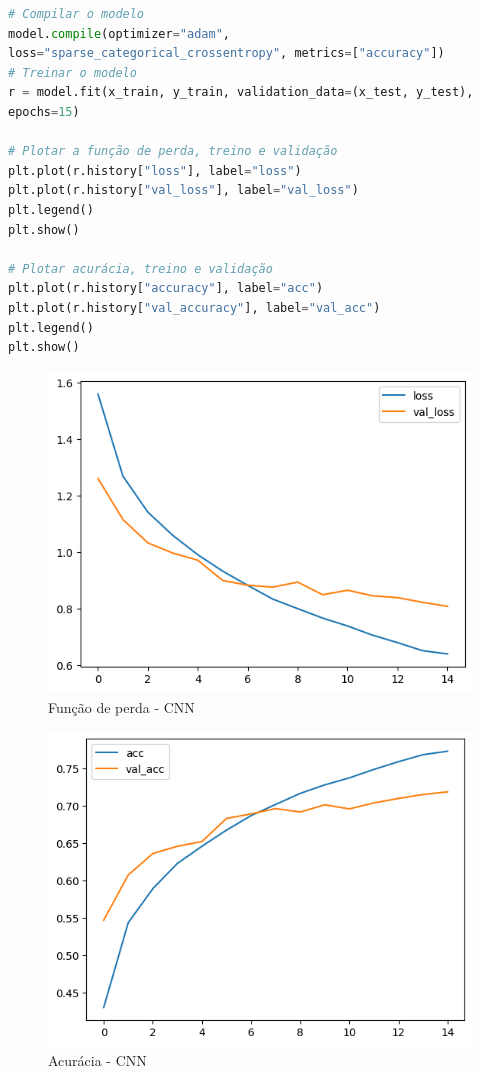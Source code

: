 \begin{lstlisting}[language=Python, style=input]
# Compilar o modelo
model.compile(optimizer="adam",
loss="sparse_categorical_crossentropy", metrics=["accuracy"])
# Treinar o modelo
r = model.fit(x_train, y_train, validation_data=(x_test, y_test),
epochs=15)

# Plotar a função de perda, treino e validação
plt.plot(r.history["loss"], label="loss")
plt.plot(r.history["val_loss"], label="val_loss")
plt.legend()
plt.show()

# Plotar acurácia, treino e validação
plt.plot(r.history["accuracy"], label="acc")
plt.plot(r.history["val_accuracy"], label="val_acc")
plt.legend()
plt.show()
\end{lstlisting}

\begin{figure}[H]
\centering
\includegraphics[width=.8\linewidth]{apendices/fig/9_IAA009_1.png}
\caption{Função de perda - CNN}
\end{figure}

\begin{figure}[H]
\centering
\includegraphics[width=.8\linewidth]{apendices/fig/9_IAA009_2.png}
\caption{Acurácia - CNN}
\end{figure}


